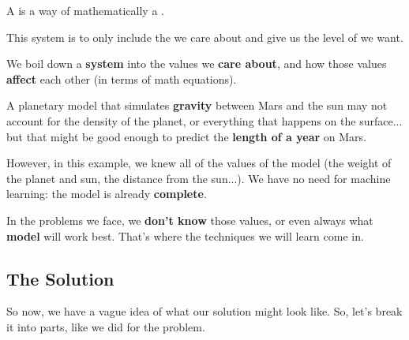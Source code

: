         \begin{definition}
            A  is a way of mathematically  a . 
            
            This system is  to only include the  we care about and give us the level of  we want.
        \end{definition}
        
        We boil down a \textbf{system} into the values we \textbf{care about}, and how those values \textbf{affect} each other (in terms of math equations).
        
        \miniex A planetary model that simulates \textbf{gravity} between Mars and the sun may not account for the density of the planet, or everything that happens on the surface... but that might be good enough to predict the \textbf{length of a year} on Mars.
        
        However, in this example, we knew all of the values of the model (the weight of the planet and sun, the distance from the sun...). We have no need for machine learning: the model is already \textbf{complete}.
        
        In the problems we face, we \textbf{don't know} those values, or even always what \textbf{model} will work best. That's where the techniques we will learn come in.
        
    \subsection{The Solution}
        
        So now, we have a vague idea of what our solution might look like. So, let's break it into parts, like we did for the problem.
        
